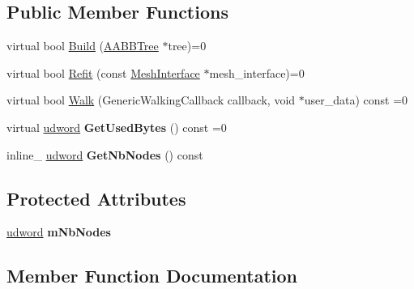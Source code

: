 \subsection*{Public Member Functions}
\begin{DoxyCompactItemize}
\item 
virtual bool \hyperlink{classOpcode_1_1AABBOptimizedTree_a395cac6d17bfbfa77c1ea441e31ce7c5}{Build} (\hyperlink{classOpcode_1_1AABBTree}{A\+A\+B\+B\+Tree} $\ast$tree)=0
\item 
virtual bool \hyperlink{classOpcode_1_1AABBOptimizedTree_a9c1c89c134a2ea4a5de4333266032fa6}{Refit} (const \hyperlink{classOpcode_1_1MeshInterface}{Mesh\+Interface} $\ast$mesh\+\_\+interface)=0
\item 
virtual bool \hyperlink{classOpcode_1_1AABBOptimizedTree_a78a98ae632876d1df1d0a5d0e0a75668}{Walk} (Generic\+Walking\+Callback callback, void $\ast$user\+\_\+data) const =0
\item 
virtual \hyperlink{IceTypes_8h_a44c6f1920ba5551225fb534f9d1a1733}{udword} {\bfseries Get\+Used\+Bytes} () const =0\hypertarget{classOpcode_1_1AABBOptimizedTree_ac02fbbe089c45fa5e0f95167aeec796a}{}\label{classOpcode_1_1AABBOptimizedTree_ac02fbbe089c45fa5e0f95167aeec796a}

\item 
inline\+\_\+ \hyperlink{IceTypes_8h_a44c6f1920ba5551225fb534f9d1a1733}{udword} {\bfseries Get\+Nb\+Nodes} () const \hypertarget{classOpcode_1_1AABBOptimizedTree_af42286dd6f277ba448728e14519512bd}{}\label{classOpcode_1_1AABBOptimizedTree_af42286dd6f277ba448728e14519512bd}

\end{DoxyCompactItemize}
\subsection*{Protected Attributes}
\begin{DoxyCompactItemize}
\item 
\hyperlink{IceTypes_8h_a44c6f1920ba5551225fb534f9d1a1733}{udword} {\bfseries m\+Nb\+Nodes}\hypertarget{classOpcode_1_1AABBOptimizedTree_a4116d37caddf74b45611217203878d5c}{}\label{classOpcode_1_1AABBOptimizedTree_a4116d37caddf74b45611217203878d5c}

\end{DoxyCompactItemize}


\subsection{Member Function Documentation}
